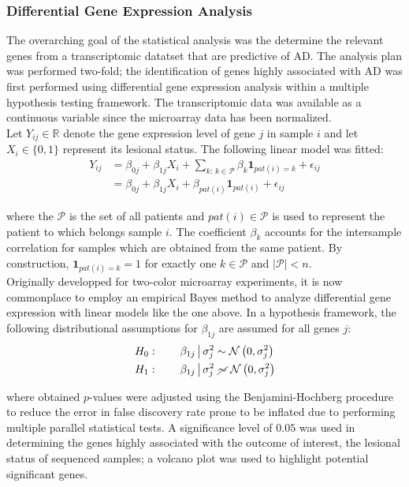 \documentclass[journal, a4paper]{IEEEtran}
\def\one{\mathbf{1}}
\begin{document}
\subsubsection{Differential Gene Expression Analysis}

The overarching goal of the statistical analysis was the determine the relevant genes from a transcriptomic datatset that are predictive of AD. The analysis plan was performed two-fold; the identification of genes highly associated with AD was first performed using differential gene expression analysis within a multiple hypothesis testing framework. The transcriptomic data was available as a continuous variable since the microarray data has been normalized.\\

Let $Y_{ij} \in \mathbb{R}$ denote the gene expression level of gene $j$ in sample $i$ and let $X_i \in \{0, 1\}$ represent its lesional status. The following linear model was fitted:
\begin{align*}
  Y_{ij} &= \beta_{0j} + \beta_{1j}X_i + \sum_{k:\,k\in\mathcal{P}}\beta_{k}\one_{pat(i) = k} + \epsilon_{ij}\\
  &=\beta_{0j} + \beta_{1j}X_i + \beta_{pat(i)}\one_{pat(i)} + \epsilon_{ij}
\end{align*}

where the $\mathcal{P}$ is the set of all patients and $pat(i) \in \mathcal{P}$ is used to represent the patient to which belongs sample $i$. The coefficient $\beta_k$ accounts for the intersample correlation for samples which are obtained from the same patient. By construction, $\one_{pat(i) = k} = 1$ for exactly one $k \in \mathcal{P}$ and $\big\vert \mathcal{P}\big\vert < n$.\\

Originally developped for two-color microarray experiments, it is now commonplace to employ an empirical Bayes method to analyze differential gene expression with linear models like the one above\cite{smyth2004linear}. In a hypothesis framework, the following distributional assumptions for $\beta_{1j}$ are assumed for all genes $j$:
\begin{align*}
  H_0:\qquad \beta_{1j} \,\big\vert\, \sigma^2_j &\sim \mathcal{N}\left(0, \sigma^2_j\right)\\
  H_1:\qquad \beta_{1j} \,\big\vert\, \sigma^2_j &\,\,\cancel{\sim}\,\, \mathcal{N}\left(0, \sigma^2_j\right)
\end{align*}

\noindent where obtained $p$-values were adjusted using the Benjamini-Hochberg procedure to reduce the error in false discovery rate prone to be inflated due to performing multiple parallel statistical tests\cite{benjamini2010discovering}. A significance level of $0.05$ was used in determining the genes highly associated with the outcome of interest, the lesional status of sequenced samples; a volcano plot was used to highlight potential significant genes.\\
\end{document}
